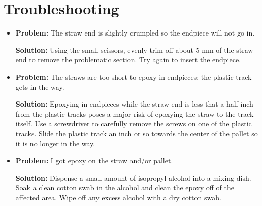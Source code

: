 \documentclass[letterpaper,12pt]{article}
\begin{document}
\section{Troubleshooting}
\begin{itemize}
\item {\bf Problem:} The straw end is slightly crumpled so the endpiece will not go in.
		\begin{adjustwidth}{1cm}{}
		{\bf Solution:} Using the small scissors, evenly trim off about 5 mm of the straw end to remove the problematic section. Try again to insert the endpiece.
		\end{adjustwidth}
		
\item {\bf Problem:} The straws are too short to epoxy in endpieces; the plastic track gets in the way.
		\begin{adjustwidth}{1cm}{}
		{\bf Solution:} Epoxying in endpieces while the straw end is less that a half inch from the plastic tracks poses a major risk of epoxying the straw to the track itself. Use a screwdriver to carefully remove the screws on one of the plastic tracks. Slide the plastic track an inch or so towards the center of the pallet so it is no longer in the way. 
		\end{adjustwidth}
		
\item {\bf Problem:} I got epoxy on the straw and/or pallet.
		\begin{adjustwidth}{1cm}{}
		{\bf Solution:} Dispense a small amount of isopropyl alcohol into a mixing dish. Soak a clean cotton swab in the alcohol and clean the epoxy off of the affected area. Wipe off any excess alcohol with a dry cotton swab.
		\end{adjustwidth}			
		
\end{itemize}
\end{document}

